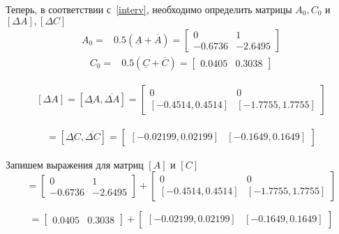 Теперь, в соответствии с~\ref{interv}, необходимо определить матрицы $A_0, C_0$ и $[\Delta A], [\Delta C]$
\begin{align}\label{midA}
	A_0 =& 0.5 (\underline{A} + \overline{A}) =
	\begin{bmatrix}
		0&1\\
		- 0.6736& -2.6495
	\end{bmatrix}
\end{align}
\begin{align}
	C_0 =& 0.5 (\underline{C} + \overline{C}) = 
	\begin{bmatrix}
		0.0405 & 0.3038
	\end{bmatrix}
\end{align}

\begin{align}\label{widA}
	[\Delta A] = [\underline{\Delta A}, \overline{\Delta A}] = 
	\begin{bmatrix}
		0&0\\
	[- 0.4514, 0.4514] & [-1.7755, 1.7755]
	\end{bmatrix}
\end{align}

\begin{align}
	[\Delta C] = [\underline{\Delta C}, \overline{\Delta C}] = 
	\begin{bmatrix}
			[-0.02199, 0.02199] & [-0.1649, 0.1649]
	\end{bmatrix}
\end{align}

Запишем выражения для матриц $[A]$ и $[C]$
\begin{equation}
	[A] =
	\begin{bmatrix}
		0&1\\
		- 0.6736& -2.6495
	\end{bmatrix} 
	+
	\begin{bmatrix}
		0&0\\
		[- 0.4514, 0.4514] & [-1.7755, 1.7755]
	\end{bmatrix}	
\end{equation}

\begin{equation}
	[C] =
	\begin{bmatrix}
		0.0405 & 0.3038
	\end{bmatrix}
	+
	\begin{bmatrix}
		[-0.02199, 0.02199] & [-0.1649, 0.1649]
	\end{bmatrix}	
\end{equation}




\newpage